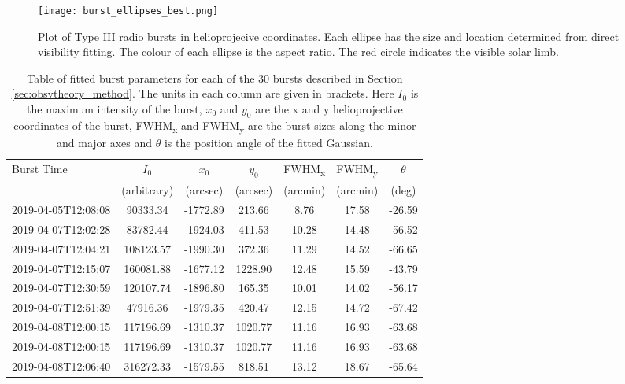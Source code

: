 \begin{figure}[ht]
\centering
\texttt{[image: burst\_ellipses\_best.png]}
\caption[Plot of Type III radio bursts in helioprojecive coordinates.]{Plot of Type III radio bursts in helioprojecive coordinates. Each ellipse has the size and location determined from direct visibility fitting. The colour of each ellipse is the aspect ratio. The red circle indicates the visible solar limb. }
\label{fig:burst_overlay}
\end{figure}

\begin{table}
\centering
\caption[Table of fitted burst parameters]{Table of fitted burst parameters for each of the 30 bursts described in Section \ref{sec:obsvtheory_method}. The units in each column are given in brackets. Here $I_0$ is the maximum intensity of the burst, $x_0$ and $y_0$ are the x and y helioprojective coordinates of the burst, FWHM\textsubscript{x} and FWHM\textsubscript{y} are the burst sizes along the minor and major axes and $\theta$ is the position angle of the fitted Gaussian.}
\label{tab:dataset}
\begin{tabular}{lcccccc}
\toprule
Burst Time & $I_0$  & $x_0$ & $y_0$  & FWHM\textsubscript{x} & FWHM\textsubscript{y} & $\theta$ \\
 & (arbitrary) & (arcsec) & (arcsec) & (arcmin) & (arcmin) &  (deg) \\
\midrule
2019-04-05T12:08:08 &   90333.34 & -1772.89 &   213.66 &    8.76 &   17.58 &  -26.59 \\
2019-04-07T12:02:28 &   83782.44 & -1924.03 &   411.53 &   10.28 &   14.48 &  -56.52 \\
2019-04-07T12:04:21 &  108123.57 & -1990.30 &   372.36 &   11.29 &   14.52 &  -66.65 \\
2019-04-07T12:15:07 &  160081.88 & -1677.12 &  1228.90 &   12.48 &   15.59 &  -43.79 \\
2019-04-07T12:30:59 &  120107.74 & -1896.80 &   165.35 &   10.01 &   14.02 &  -56.17 \\
2019-04-07T12:51:39 &   47916.36 & -1979.35 &   420.47 &   12.15 &   14.72 &  -67.42 \\
2019-04-08T12:00:15 &  117196.69 & -1310.37 &  1020.77 &   11.16 &   16.93 &  -63.68 \\
2019-04-08T12:00:15 &  117196.69 & -1310.37 &  1020.77 &   11.16 &   16.93 &  -63.68 \\
2019-04-08T12:06:40 &  316272.33 & -1579.55 &   818.51 &   13.12 &   18.67 &  -65.64 \\

\end{tabular}
\end{table}
